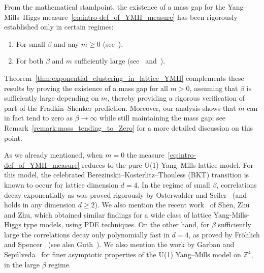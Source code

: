 \documentclass[11pt]{article}
\theoremstyle{definition}
\theoremstyle{remark}
\numberwithin{theorem}{section}
\newcommand{\bZ}{\mathbb Z}
\begin{document}
    From the mathematical standpoint, the existence of a mass gap for the Yang--Mills--Higgs measure~\eqref{eq:intro-def_of_YMH_measure} has been rigorously established only in certain regimes: 
    \begin{enumerate}
        \item[{\tt (I) }] For small $\beta$ and any $m\ge 0$ (see~\cite{Osterwalder-Seiler, Seiler-book}). 
         \item[{\tt (II)}] For both $\beta$ and $m$ sufficiently large (see~\cite{Seiler-book} and~\cite[Appendix]{Fradkin-Shenker}). 
    \end{enumerate}
    Theorem~\ref{thm:exponential_clustering_in_lattice_YMH} complements these results by proving the existence of a mass gap for all $m>0$, assuming that $\beta$ is sufficiently large depending on $m$, thereby providing a rigorous verification of part of the Fradkin--Shenker prediction. Moreover, our analysis shows that $m$ can in fact tend to zero as $\beta\to\infty$ while still maintaining the mass gap; see Remark~\ref{remark:mass_tending_to_Zero} for a more detailed discussion on this point. 
    
    As we already mentioned, when $m=0$ the measure~\eqref{eq:intro-def_of_YMH_measure} reduces to the pure U(1) Yang--Mills lattice model. For this model, the celebrated Berezinskii–Kosterlitz–Thouless (BKT) transition is known to occur for lattice dimension $d=4$. In the regime of small $\beta$, correlations decay exponentially as was proved rigorously by Osterwalder and Seiler~\cite{Osterwalder-Seiler} (and holds in any dimension $d\ge 2$). We also mention the recent work~\cite{Shen-Zhu-Zhu} of Shen, Zhu and Zhu, which obtained similar findings for a wide class of lattice Yang-Mills-Higgs type models, using PDE techniques. 
    On the other hand, for $\beta$ sufficiently large the correlations decay only polynomially fast in $d=4$, as proved by Fr\"ohlich and Spencer~\cite{Frohlich-Spencer} (see also Guth~\cite{guth80}). We also mention the work by Garban and Sep\'ulveda~\cite{Garban-Sepulveda-IMRN2023} for finer asymptotic properties of the U(1) Yang--Mills model on $\bZ^4$, in the large $\beta$ regime. 
\end{document}
